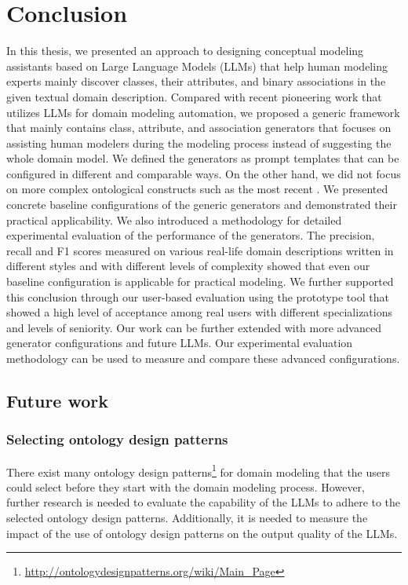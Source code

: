 \chapter{Conclusion}

In this thesis, we presented an approach to designing conceptual modeling assistants based on Large Language Models (LLMs) that help human modeling experts mainly discover classes, their attributes, and binary associations in the given textual domain description.
Compared with recent pioneering work that utilizes LLMs for domain modeling automation, we proposed a generic framework that mainly contains class, attribute, and association generators that focuses on assisting human modelers during the modeling process instead of suggesting the whole domain model.
We defined the generators as prompt templates that can be configured in different and comparable ways.
On the other hand, we did not focus on more complex ontological constructs such as the most recent \cite{Saeedizade2024}.
We presented concrete baseline configurations of the generic generators and demonstrated their practical applicability.
We also introduced a methodology for detailed experimental evaluation of the performance of the generators.
The precision, recall and F1 scores measured on various real-life domain descriptions written in different styles and with different levels of complexity showed that even our baseline configuration is applicable for practical modeling.
We further supported this conclusion through our user-based evaluation using the prototype tool that showed a high level of acceptance among real users with different specializations and levels of seniority.
Our work can be further extended with more advanced generator configurations and future LLMs.
Our experimental evaluation methodology can be used to measure and compare these advanced configurations.


\section{Future work}


\subsection{Selecting ontology design patterns}

There exist many ontology design patterns\footnote{\url{http://ontologydesignpatterns.org/wiki/Main_Page}} for domain modeling that the users could select before they start with the domain modeling process. However, further research is needed to evaluate the capability of the LLMs to adhere to the selected ontology design patterns. Additionally, it is needed to measure the impact of the use of ontology design patterns on the output quality of the LLMs. 


